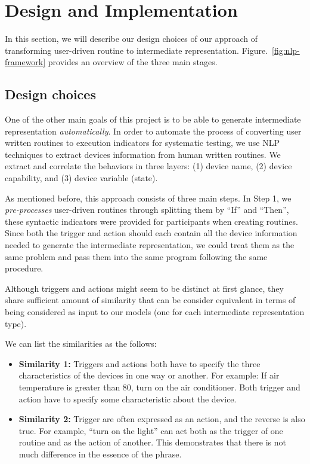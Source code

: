 \section{Design and Implementation}
\label{sec:design}




In this section, we will describe our design choices of our approach of transforming user-driven routine to intermediate representation. Figure.~\ref{fig:nlp-framework} provides an overview of the three main stages.


\subsection{Design choices}
One of the other main goals of this project is to be able to generate intermediate representation \textit{automatically}. In order to automate the process of converting user written routines to execution indicators for systematic testing, we use NLP techniques to extract devices information from human written routines. We extract and
correlate the behaviors in three layers: {\sf (1)} device name, {\sf (2)} device capability, and {\sf (3)} device variable (state).

As mentioned before, this approach consists of three main steps. In Step 1, we \textit{pre-processes} user-driven routines through splitting them by ``If'' and ``Then'', these syntactic indicators were provided for participants when creating routines. Since both the trigger and action should each contain all the device information needed to generate the intermediate representation, we could treat them as the same problem and pass them into the same program following the same procedure.

Although triggers and actions might seem to be distinct at first glance, they share sufficient amount of similarity that can be consider equivalent in terms of being considered as input to our models (one for each intermediate representation type).

We can list the similarities as the follows:
\begin{itemize}
    \item \textbf{Similarity 1:} Triggers and actions both have to specify the three characteristics of the devices in one way or another. For example: If air temperature is greater than 80, turn on the air conditioner. Both trigger and action have to specify some characteristic about the device.
    \item \textbf{Similarity 2:} Trigger are often expressed as an action, and the reverse is also true. For example, ``turn on the light'' can act both as the trigger of one routine and as the action of another. This demonstrates that there is not much difference in the essence of the phrase.
\end{itemize}

